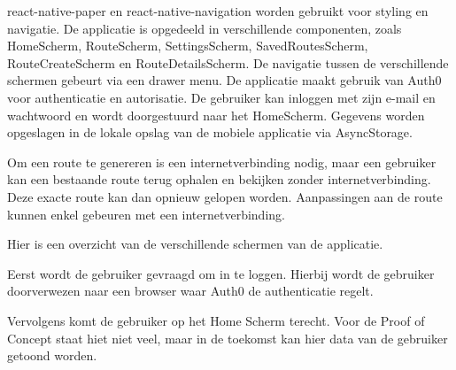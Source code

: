     react-native-paper en react-native-navigation worden gebruikt voor styling en navigatie. 
    De applicatie is opgedeeld in verschillende componenten, 
    zoals HomeScherm, RouteScherm, SettingsScherm, SavedRoutesScherm, RouteCreateScherm en RouteDetailsScherm. 
    De navigatie tussen de verschillende schermen gebeurt via een drawer menu. 
    De applicatie maakt gebruik van Auth0 voor authenticatie en autorisatie. 
    De gebruiker kan inloggen met zijn e-mail en wachtwoord en wordt doorgestuurd naar het HomeScherm. 
    Gegevens worden opgeslagen in de lokale opslag van de mobiele applicatie via AsyncStorage.

    Om een route te genereren is een internetverbinding nodig, 
    maar een gebruiker kan een bestaande route terug ophalen en bekijken zonder internetverbinding. Deze exacte route kan dan opnieuw gelopen worden. Aanpassingen aan de route kunnen enkel gebeuren met een internetverbinding.
    
    Hier is een overzicht van de verschillende schermen van de applicatie.
    
    Eerst wordt de gebruiker gevraagd om in te loggen. Hierbij wordt de gebruiker doorverwezen naar een browser waar Auth0 de authenticatie regelt.


    Vervolgens komt de gebruiker op het Home Scherm terecht. Voor de Proof of Concept staat hiet niet veel, 
    maar in de toekomst kan hier data van de gebruiker getoond worden.

